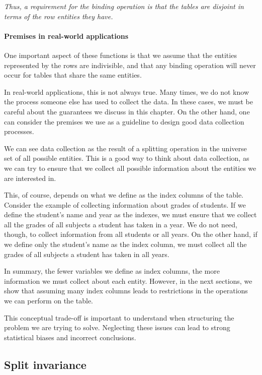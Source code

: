 \emph{Thus, a requirement for the binding operation is that the tables are disjoint in
terms of the row entities they have.}

\paragraph{Premises in real-world applications}

One important aspect of these functions is that we assume that the entities represented by
the rows are indivisible, and that any binding operation will never occur for tables that
share the same entities.

In real-world applications, this is not always true.  Many times, we do not know the
process someone else has used to collect the data.  In these cases, we must be careful
about the guarantees we discuss in this chapter.  On the other hand, one can consider the
premises we use as a guideline to design good data collection processes.

We can see data collection as the result of a splitting operation in the universe set of
all possible entities.  This is a good way to think about data collection, as we can try
to ensure that we collect all possible information about the entities we are interested
in.

This, of course, depends on what we define as the index columns of the table.  Consider
the example of collecting information about grades of students.  If we define the student's
name and year as the indexes, we must ensure that we collect all the grades of all
subjects a student has taken in a year.  We do not need, though, to collect information
from all students or all years.  On the other hand, if we define only the student's name
as the index column, we must collect all the grades of all subjects a student has taken
in all years.

In summary, the fewer variables we define as index columns, the more information we must
collect about each entity.  However, in the next sections, we show that assuming many index columns
leads to restrictions in the operations we can perform on the table.

This conceptual trade-off is important to understand when structuring the problem we are
trying to solve.  Neglecting these issues can lead to strong statistical biases and
incorrect conclusions.

\subsection{Split invariance}

